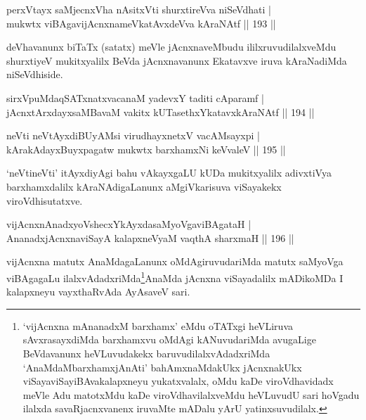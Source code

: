 \begin{shl}
perxVtayx saMjecnxVha nAsitxVti shurxtireVva niSeVdhati |\\
mukwtx viBAgavijAcnxnameVkatAvxdeVva kAraNAtf \hfill || 193 ||
\end{shl}

\begin{artha}
deVhavanunx biTaTx (satatx) meVle jAcnxnaveMbudu  ililxruvudilalxveMdu shurxtiyeV mukitxyalilx BeVda jAcnxnavanunx Ekatavxve iruva kAraNadiMda niSeVdhiside.
\end{artha}

\begin{shl}
sirxVpuMdaqSATxnatxvacanaM yadevxY taditi cAparamf |\\
jAcnxtArxdayxsaMBavaM vakitx kUTasethxYkatavxkAraNAtf \hfill || 194 ||
\end{shl}

\begin{shl}
neVti neVtAyxdiBUyAMsi virudhayxnetxV vacAMsayxpi |\\
kArakAdayxBuyxpagatw mukwtx barxhamxNi keVvaleV \hfill || 195 ||
\end{shl}

\begin{artha}
`neVtineVti' itAyxdiyAgi bahu vAkayxgaLU kUDa mukitxyalilx adivxtiVya barxhamxdalilx kAraNAdigaLanunx aMgiVkarisuva viSayakekx viroVdhisutatxve.
\end{artha}

\begin{shl}
vijAcnxnAnadxyoVshecxYkAyxdasaMyoVgaviBAgataH |\\
AnanadxjAcnxnaviSayA kalapxneVyaM vaqthA sharxmaH \hfill || 196 ||
\end{shl}	

\begin{artha}
vijAcnxna matutx AnaMdagaLanunx oMdAgiruvudariMda matutx saMyoVga viBAgagaLu ilalxvAdadxriMda\footnote[1]{`vijAcnxna mAnanadxM barxhamx' eMdu oTATxgi heVLiruva sAvxrasayxdiMda barxhamxvu oMdAgi kANuvudariMda avugaLige BeVdavanunx heVLuvudakekx baruvudilalxvAdadxriMda `AnaMdaMbarxhamxjAnAti' bahAmxnaMdakUkx jAcnxnakUkx viSayaviSayiBAvakalapxneyu yukatxvalalx, oMdu kaDe viroVdhavidadx meVle Adu matotxMdu kaDe viroVdhavilalxveMdu heVLuvudU sari hoVgadu ilalxda savaRjacnxvanenx iruvaMte mADalu yArU yatinxsuvudilalx.}AnaMda jAcnxna viSayadalilx mADikoMDa I kalapxneyu vayxthaRvAda AyAsaveV sari.
\end{artha}


